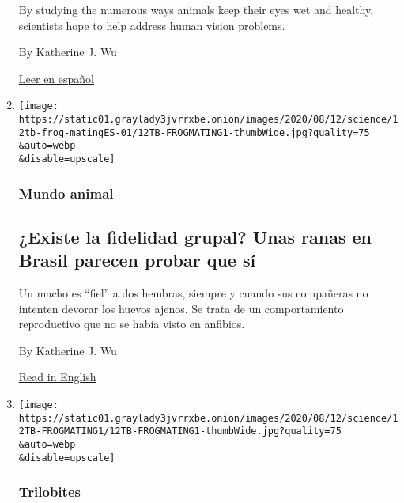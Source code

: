 \begin{enumerate}
  By studying the numerous ways animals keep their eyes wet and healthy,
  scientists hope to help address human vision problems.

  By Katherine J. Wu

  \href{https://www.nytimes3xbfgragh.onion/es/2020/08/15/espanol/ciencia-y-tecnologia/ojo-seco.html}{Leer
  en español}
\item
  \href{/es/2020/08/12/espanol/ciencia-y-tecnologia/ranas-brasil.html}{}

  \texttt{[image: https://static01.graylady3jvrrxbe.onion/images/2020/08/12/science/12tb-frog-matingES-01/12TB-FROGMATING1-thumbWide.jpg?quality=75\\\&auto=webp\\\&disable=upscale]}

  \hypertarget{mundo-animal-1}{%
  \subsubsection{Mundo animal}\label{mundo-animal-1}}

  \hypertarget{existe-la-fidelidad-grupal-unas-ranas-en-brasil-parecen-probar-que-suxed}{%
  \subsection{¿Existe la fidelidad grupal? Unas ranas en Brasil parecen
  probar que
  sí}\label{existe-la-fidelidad-grupal-unas-ranas-en-brasil-parecen-probar-que-suxed}}

  Un macho es ``fiel'' a dos hembras, siempre y cuando sus compañeras no
  intenten devorar los huevos ajenos. Se trata de un comportamiento
  reproductivo que no se había visto en anfibios.

  By Katherine J. Wu

  \href{https://www.nytimes3xbfgragh.onion/2020/08/12/science/frog-group-fidelity.html}{Read
  in English}
\item
  \href{/2020/08/12/science/frog-group-fidelity.html}{}

  \texttt{[image: https://static01.graylady3jvrrxbe.onion/images/2020/08/12/science/12TB-FROGMATING1/12TB-FROGMATING1-thumbWide.jpg?quality=75\\\&auto=webp\\\&disable=upscale]}

  \hypertarget{trilobites}{%
  \subsubsection{Trilobites}\label{trilobites}}

  \hypertarget{he-doesnt-mind-being-shared-unless-his-mates-try-to-eat-each-others-eggs}{%
}
\end{enumerate}
